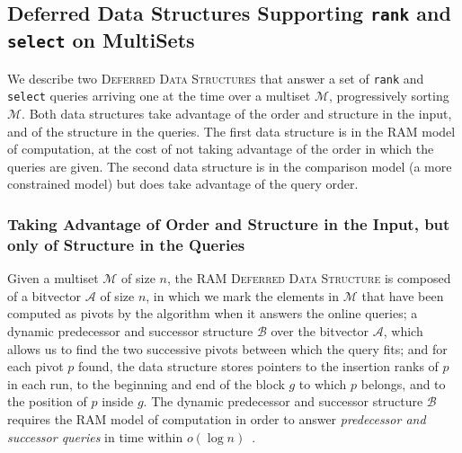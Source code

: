 \newpage

\subsection{Deferred Data Structures Supporting \texttt{rank} and
  \texttt{select} on MultiSets}
\label{sec:dds}

We describe two \textsc{Deferred Data Structures} that answer a set of \texttt{rank} and \texttt{select} queries arriving one at the time over a multiset $\mathcal{M}$, progressively sorting $\mathcal{M}$.  
%
Both data structures take advantage of the order and structure in the input, and of the structure in the queries.
%
The first data structure is in the RAM model of computation, at the cost of not taking advantage of the order in which the queries are given. The second data structure is in the comparison model (a more constrained model) but does take advantage of the query order.

\subsubsection{Taking Advantage of  Order and Structure in the Input, but only of Structure in the Queries}

Given a multiset $\mathcal{M}$ of size $n$, the \textsc{RAM Deferred
  Data Structure} is composed of a bitvector $\mathcal{A}$ of size
$n$, in which we mark the elements in $\mathcal{M}$ that have been
computed as pivots by the algorithm when it answers the online
queries; a dynamic predecessor and successor structure $\mathcal{B}$
over the bitvector $\mathcal{A}$, which allows us to find the two
successive pivots between which the query fits; and for each pivot $p$
found, the data structure stores pointers to the insertion ranks of
$p$ in each run, to the beginning and end of the block $g$ to which
$p$ belongs, and to the position of $p$ inside $g$. The dynamic
predecessor and successor structure $\mathcal{B}$ requires the RAM
model of computation in order to answer \emph{predecessor and
  successor queries} in time within
$o(\log{n})$~\cite{2002-JCSS-OptimalBoundsForThePredecessorProblemAndRelatedProblems-BeameFich}.

